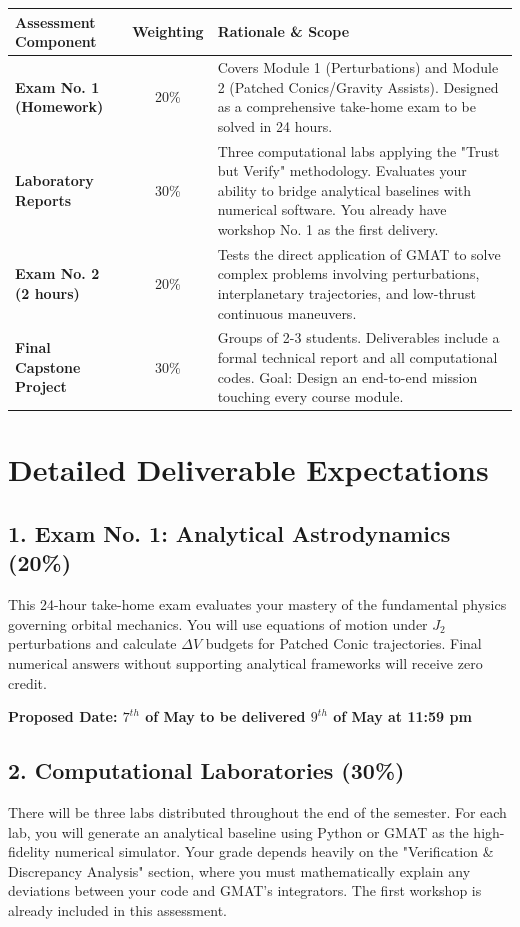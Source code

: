 \documentclass[11pt, letterpaper]{article}
\begin{document}
\begin{table}[h!]
\centering
\renewcommand{\arraystretch}{1.5}
\begin{tabularx}{\textwidth}{@{} l c X @{}}
\toprule
\textbf{Assessment Component} & \textbf{Weighting} & \textbf{Rationale \& Scope} \\ \midrule
\textbf{Exam No. 1 (Homework)} & 20\% & Covers Module 1 (Perturbations) and Module 2 (Patched Conics/Gravity Assists). Designed as a comprehensive take-home exam to be solved in 24 hours. \\
\textbf{Laboratory Reports} & 30\% & Three computational labs applying the "Trust but Verify" methodology. Evaluates your ability to bridge analytical baselines with numerical software. You already have workshop No. 1 as the first delivery. \\
\textbf{Exam No. 2 (2 hours)} & 20\% & Tests the direct application of GMAT to solve complex problems involving perturbations, interplanetary trajectories, and low-thrust continuous maneuvers. \\
\textbf{Final Capstone Project} & 30\% & Groups of 2-3 students. Deliverables include a formal technical report and all computational codes. Goal: Design an end-to-end mission touching every course module. \\ \bottomrule
\end{tabularx}
\end{table}

\section*{Detailed Deliverable Expectations}

\subsection*{1. Exam No. 1: Analytical Astrodynamics (20\%)}
This 24-hour take-home exam evaluates your mastery of the fundamental physics governing orbital mechanics. You will use equations of motion under $J_2$ perturbations and calculate $\Delta V$ budgets for Patched Conic trajectories. Final numerical answers without supporting analytical frameworks will receive zero credit.

\textbf{Proposed Date: $7^{th}$ of May to be delivered $9^{th}$ of May at 11:59 pm}

\subsection*{2. Computational Laboratories (30\%)}
There will be three labs distributed throughout the end of the semester. For each lab, you will generate an analytical baseline using Python or GMAT as the high-fidelity numerical simulator. Your grade depends heavily on the "Verification \& Discrepancy Analysis" section, where you must mathematically explain any deviations between your code and GMAT's integrators. The first workshop is already included in this assessment.
\end{document}
